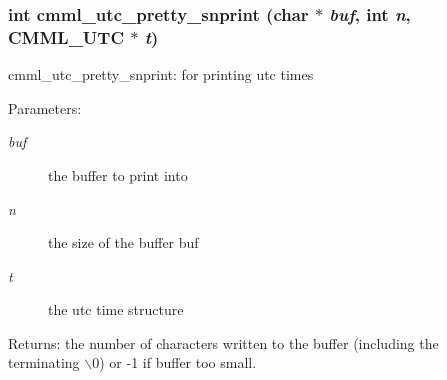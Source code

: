 \subsubsection{\setlength{\rightskip}{0pt plus 5cm}int cmml\_\-utc\_\-pretty\_\-snprint (char $\ast$ {\em buf}, int {\em n}, {\bf CMML\_\-UTC} $\ast$ {\em t})}\label{cmml_8h_a111}


cmml\_\-utc\_\-pretty\_\-snprint: for printing utc times

\begin{Desc}
\item[Parameters:]
\begin{description}
\item[{\em buf}]the buffer to print into \item[{\em n}]the size of the buffer buf \item[{\em t}]the utc time structure\end{description}
\end{Desc}
\begin{Desc}
\item[Returns:]the number of characters written to the buffer (including the terminating $\backslash$0) or -1 if buffer too small. \end{Desc}
